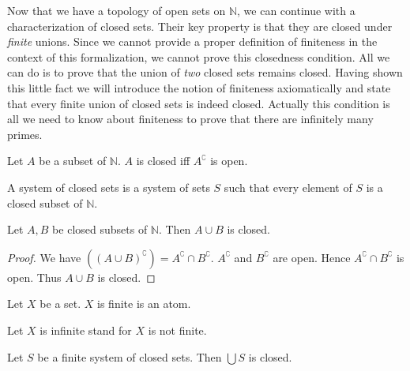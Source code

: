 \documentclass{article}
\begin{document}
  Now that we have a topology of open sets on $\mathbb{N}$, we can continue
  with a characterization of closed sets.
  Their key property is that they are closed under \textit{finite} unions.
  Since we cannot provide a proper definition of finiteness in the context of
  this formalization, we cannot prove this closedness condition.
  All we can do is to prove that the union of \textit{two} closed sets remains
  closed.
  Having shown this little fact we will introduce the notion of finiteness
  axiomatically and state that every finite union of closed sets is indeed
  closed.
  Actually this condition is all we need to know about finiteness to prove that
  there are infinitely many primes.

  \begin{forthel}
    \begin{definition}
      Let $A$ be a subset of $\mathbb{N}$.
      $A$ is closed iff $A^{\complement}$ is open.
    \end{definition}

    \begin{definition}
      A system of closed sets is a system of sets $S$ such that every element of $S$ is a closed subset of $\mathbb{N}$.
    \end{definition}

    \begin{lemma}
      Let $A,B$ be closed subsets of $\mathbb{N}$.
      Then $A \cup B$ is closed.
    \end{lemma}
    \begin{proof}
      We have $((A \cup B)^{\complement}) = A^{\complement} \cap B^{\complement}$.
      $A^{\complement}$ and $B^{\complement}$ are open.
      Hence $A^{\complement} \cap B^{\complement}$ is open.
      Thus $A \cup B$ is closed.
    \end{proof}

    \begin{signature}
      Let $X$ be a set.
      $X$ is finite is an atom.
    \end{signature}

    Let $X$ is infinite stand for $X$ is not finite.

    \begin{axiom}
      Let $S$ be a finite system of closed sets.
      Then $\bigcup S$ is closed.
    \end{axiom}
  \end{forthel}
\end{document}
